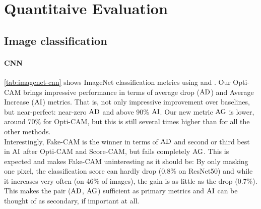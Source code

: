 \section{Quantitaive Evaluation}
\label{sec:oc_quant}

\subsection{Image classification}

\paragraph{CNN}
\autoref{tab:imagenet-cnn} shows ImageNet classification metrics using  and .
 Our Opti-CAM brings impressive performance in terms of average drop ($\operatorname{AD}$) and Average Increase 
 ($\operatorname{AI}$) metrics. That is, not only impressive improvement over baselines, but near-perfect: 
 near-zero $\operatorname{AD}$ and above 90\% $\operatorname{AI}$. Our new metric $\operatorname{AG}$ is lower, around 70\% 
 for Opti-CAM, but this is still several times higher than for all the other methods.\\

\noindent Interestingly, Fake-CAM \autocite{poppi2021revisiting} is the winner in terms of $\operatorname{AD}$ 
and second or third best in $\operatorname{AI}$ after Opti-CAM and Score-CAM, but fails completely $\operatorname{AG}$. This is 
expected and makes Fake-CAM uninteresting as it should be: By only masking one pixel, the 
classification score can hardly drop (0.8\% on ResNet50) and while it increases very often (on 
46\% of images), the gain is as little as the drop (0.7\%). This makes the pair ($\operatorname{AD}$, $\operatorname{AG}$) 
sufficient as primary metrics and $\operatorname{AI}$ can be thought of as secondary, if important at all.



